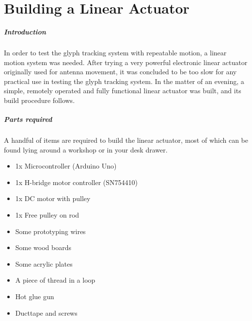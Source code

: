 \chapter{Building a Linear Actuator}
\label{ch:actuator}
\paragraph{Introduction}
In order to test the glyph tracking system with repeatable motion, a linear motion system was needed. After trying a very powerful electronic linear actuator originally used for antenna movement, it was concluded to be too slow for any practical use in testing the glyph tracking system. In the matter of an evening, a simple, remotely operated and fully functional linear actuator was built, and its build procedure follows.

\paragraph{Parts required}
A handful of items are required to build the linear actuator, most of which can be found lying around a workshop or in your desk drawer.

\begin{itemize}  
        \item 1x Microcontroller (Arduino Uno)
        \item 1x H-bridge motor controller (SN754410)
        \item 1x DC motor with pulley
        \item 1x Free pulley on rod
        \item Some prototyping wires
        \item Some wood boards
        \item Some acrylic plates
        \item A piece of thread in a loop
        \item Hot glue gun
        \item Ducttape and screws
\end{itemize}

